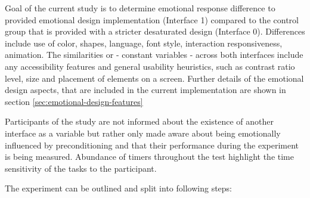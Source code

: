 	Goal of the current study is to determine emotional response difference to provided emotional design implementation (Interface 1) compared to the control group that is provided with a stricter desaturated design (Interface 0). Differences include use of color, shapes, language, font style, interaction responsiveness, animation. The similarities or - constant variables - across both interfaces include any accessibility features and general usability heuristics, such as contrast ratio level, size and placement of elements on a screen. Further details of the emotional design aspects, that are included in the current implementation are shown in section \ref{sec:emotional-design-features}
	
	Participants of the study are not informed about the existence of another interface as a variable but rather only made aware about being emotionally influenced by preconditioning and that their performance during the experiment is being measured. Abundance of timers throughout the test highlight the time sensitivity of the tasks to the participant.
	
	The experiment can be outlined and split into following steps:
	
